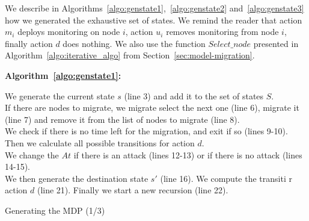 We describe in Algorithms~\ref{algo:genstate1},~\ref{algo:genstate2} and~\ref{algo:genstate3} how we generated the exhaustive set of states.
We remind the reader that action $m_i$ deploys monitoring on node $i$, action $u_i$ removes monitoring from node $i$, finally action $d$ does nothing.
We also use the function $Select\_node$ presented in Algorithm~\ref{algo:iterative_algo} from Section~\ref{sec:model-migration}.


\textbf{Algorithm~\ref{algo:genstate1}:}

We generate the current state $s$ (line 3) and add it to the set of states $S$.\\
If there are nodes to migrate, we migrate select the next one (line 6), migrate it (line 7) and remove it from the list of nodes to migrate (line 8).\\
We check if there is no time left for the migration, and exit if so (lines 9-10).\\
Then we calculate all possible transitions for action $d$.\\
We change the $At$ if there is an attack (lines 12-13) or if there is no attack (lines 14-15).\\
We then generate the destination state $s'$ (line 16).
We compute the transiti r action $d$ (line 21).
Finally we start a new recursion (line 22).

\begin{algorithm}[htbp]
  \DontPrintSemicolon
  \LinesNumbered
\SetAlgoLined
    \caption{Generating the MDP (1/3)} 
    \label{algo:genstate1}
    \end{algorithm}
    
